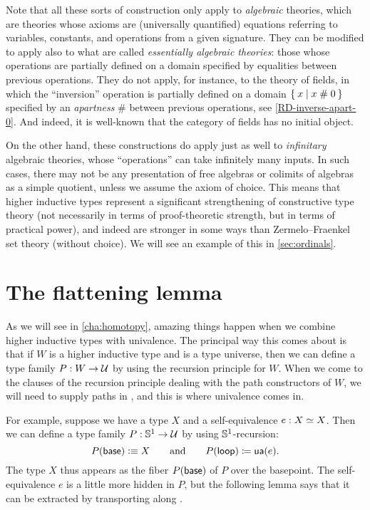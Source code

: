 \mentalpause

Note that all these sorts of construction only apply to \emph{algebraic} theories, which are theories whose axioms are (universally quantified) equations referring to variables, constants, and operations from a given signature.
They can be modified to apply also to what are called \emph{essentially algebraic theories}: those whose operations are partially defined on a domain specified by equalities between previous operations.
They do not apply, for instance, to the theory of fields, in which the ``inversion'' operation is partially defined on a domain $\Set{x | x \mathrel{\#} 0}$ specified by an \emph{apartness} $\#$ between previous operations, see \autoref{RD-inverse-apart-0}.
And indeed, it is well-known that the category of fields has no initial object.

On the other hand, these constructions do apply just as well to \emph{infinitary} algebraic theories, whose ``operations'' can take infinitely many inputs.
In such cases, there may not be any presentation of free algebras or colimits of algebras as a simple quotient, unless we assume the axiom of choice.
This means that higher inductive types represent a significant strengthening of constructive type theory (not necessarily in terms of proof-theoretic strength, but in terms of practical power), and indeed are stronger in some ways than Zermelo--Fraenkel set theory (without choice).
We will see an example of this in \autoref{sec:ordinals}.


\section{The flattening lemma}
\label{sec:flattening}

As we will see in \autoref{cha:homotopy}, amazing things happen when we combine higher inductive types with univalence.
The principal way this comes about is that if $W$ is a higher inductive type and \UU is a type universe, then we can define a type family $P:W\to \mathcal{U}$ by using the recursion principle for $W$.
When we come to the clauses of the recursion principle dealing with the path constructors of $W$, we will need to supply paths in \UU, and this is where univalence comes in.

For example, suppose we have a type $X$ and a self-equivalence $e:X \simeq X$.
Then we can define a type family $P:\mathbb{S}^1 \to \mathcal{U}$ by using $\mathbb{S}^1$-recursion:
\begin{equation*}
  P(\mathsf{base}) \vcentcolon\equiv X
  \qquad\text{and}\qquad
  {P}\mathopen{}\left({\mathsf{loop}}\right)\mathclose{} \coloneqq \mathsf{ua}(e).
\end{equation*}
The type $X$ thus appears as the fiber $P(\mathsf{base})$ of $P$ over the basepoint.
The self-equivalence $e$ is a little more hidden in $P$, but the following lemma says that it can be extracted by transporting along \lloop.

